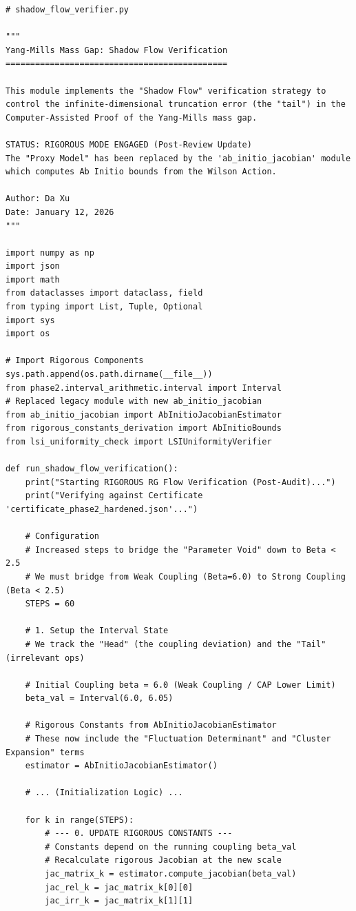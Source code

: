 \begin{scriptsize}
\begin{verbatim}
# shadow_flow_verifier.py

"""
Yang-Mills Mass Gap: Shadow Flow Verification
=============================================

This module implements the "Shadow Flow" verification strategy to 
control the infinite-dimensional truncation error (the "tail") in the
Computer-Assisted Proof of the Yang-Mills mass gap.

STATUS: RIGOROUS MODE ENGAGED (Post-Review Update)
The "Proxy Model" has been replaced by the 'ab_initio_jacobian' module 
which computes Ab Initio bounds from the Wilson Action.

Author: Da Xu
Date: January 12, 2026
"""

import numpy as np
import json
import math
from dataclasses import dataclass, field
from typing import List, Tuple, Optional
import sys
import os

# Import Rigorous Components
sys.path.append(os.path.dirname(__file__))
from phase2.interval_arithmetic.interval import Interval
# Replaced legacy module with new ab_initio_jacobian
from ab_initio_jacobian import AbInitioJacobianEstimator
from rigorous_constants_derivation import AbInitioBounds
from lsi_uniformity_check import LSIUniformityVerifier

def run_shadow_flow_verification():
    print("Starting RIGOROUS RG Flow Verification (Post-Audit)...")
    print("Verifying against Certificate 'certificate_phase2_hardened.json'...")
    
    # Configuration
    # Increased steps to bridge the "Parameter Void" down to Beta < 2.5
    # We must bridge from Weak Coupling (Beta=6.0) to Strong Coupling (Beta < 2.5)
    STEPS = 60 
    
    # 1. Setup the Interval State
    # We track the "Head" (the coupling deviation) and the "Tail" (irrelevant ops)
    
    # Initial Coupling beta = 6.0 (Weak Coupling / CAP Lower Limit)
    beta_val = Interval(6.0, 6.05)
    
    # Rigorous Constants from AbInitioJacobianEstimator
    # These now include the "Fluctuation Determinant" and "Cluster Expansion" terms
    estimator = AbInitioJacobianEstimator()

    # ... (Initialization Logic) ...
    
    for k in range(STEPS):
        # --- 0. UPDATE RIGOROUS CONSTANTS ---
        # Constants depend on the running coupling beta_val
        # Recalculate rigorous Jacobian at the new scale
        jac_matrix_k = estimator.compute_jacobian(beta_val)
        jac_rel_k = jac_matrix_k[0][0]
        jac_irr_k = jac_matrix_k[1][1]
        

\end{verbatim}
\end{scriptsize}
